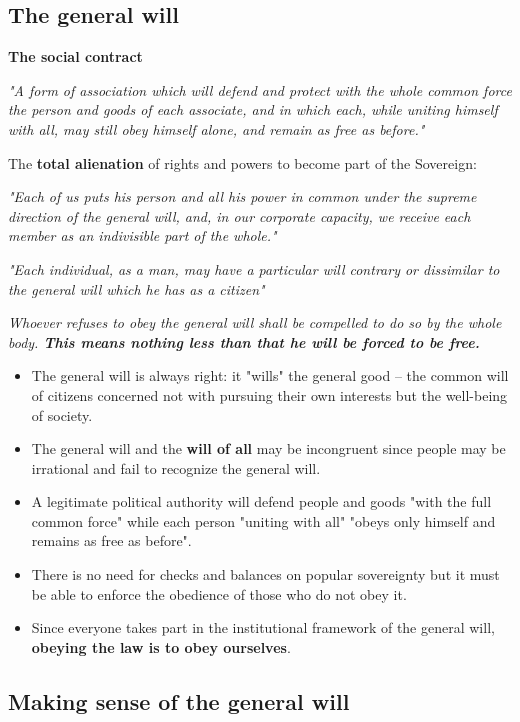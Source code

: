 \subsection{The general will}

\textbf{The social contract}

\textit{
"A form of association which will defend and protect with the whole common
force the person and goods of each associate, and in which each, while uniting
himself with all, may still obey himself alone, and remain as free as before."
}

The \textbf{total alienation} of rights and powers to become part of the
Sovereign:

\textit{
"Each of us puts his person and all his power in common under the supreme
direction of the general will, and, in our corporate capacity, we receive each
member as an indivisible part of the whole."
}

\textit{
"Each individual, as a man, may have a particular will contrary or dissimilar
to the general will which he has as a citizen"
}

\textit{
Whoever refuses to obey the general will shall be compelled to do so by the
whole body.
\textbf{This means nothing less than that he will be forced to be free.}
}


\begin{itemize}
	\item The general will is always right: it "wills" the general good
	-- the common will of citizens concerned not with pursuing their
	own interests but the well-being of society.
	\item The general will and the \textbf{will of all} may be incongruent
	since people may be irrational and fail to recognize the general will.
	\item A legitimate political authority will defend people and goods
	"with the full common force" while each person "uniting with all"
	"obeys only himself and remains as free as before".
	\item There is no need for checks and balances on popular sovereignty
	but it must be able to enforce the obedience of those who do not
	obey it.
	\item Since everyone takes part in the institutional framework of the
	general will, \textbf{obeying the law is to obey ourselves}.
\end{itemize}

\subsection{Making sense of the general will}

